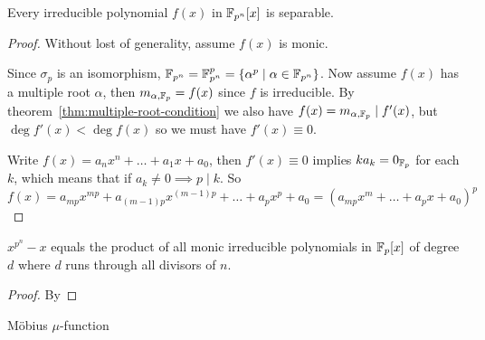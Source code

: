 \begin{lemma}
  Every irreducible polynomial $f(x)$ in $\mathbb{F}_{p^n}[x]$ is separable.

  \begin{proof}
    Without lost of generality, assume $f(x)$ is monic.

    Since $\sigma_p$ is an isomorphism, $\mathbb{F}_{p^n} = \mathbb{F}_{p^n}^p = \{ \alpha^p \mid \alpha \in \mathbb{F}_{p^n}\}$.
    Now assume $f(x)$ has a multiple root $\alpha$, then $m_{\alpha, \mathbb{F}_p} = f(x)$ since $f$
    is irreducible. By theorem~\ref{thm:multiple-root-condition} we also have
    $f(x) = m_{\alpha, \mathbb{F}_p} \mid f'(x)$, but $\deg f'(x) < \deg f(x)$ so we must have $f'(x) \equiv 0$.

    Write $f(x) = a_n x^n + \ldots + a_1 x + a_0$, then $f'(x) \equiv 0$ implies $k a_k = 0_{\mathbb{F}_p}$ for each $k$,
    which means that if $a_k \neq 0 \implies p \mid k$. So
    \[ f(x) = a_{mp} x^{mp} + a_{(m-1)p} x^{(m-1)p} + \ldots + a_p x^p + a_0 = (a_{mp} x^m + \ldots + a_p x + a_0)^p \]
  \end{proof}
\end{lemma}

\begin{theorem}
  $x^{p^n} - x$ equals the product of all monic irreducible polynomials in $\mathbb{F}_p[x]$ of degree $d$ where
  $d$ runs through all divisors of $n$.

  \begin{proof}
    By 
  \end{proof}
\end{theorem}

\begin{definition}
  M\"{o}bius $\mu$-function
\end{definition}
